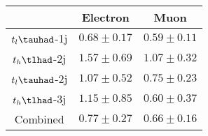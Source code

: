 \centering
\begin{tabular}{|c|c|c|} \hline
 & Electron & Muon\\\hline
$t_{l}\tauhad$-1j & $0.68\pm0.17$ & $0.59\pm0.11$\\\hline
$t_{h}\tlhad$-2j & $1.57\pm0.69$ & $1.07\pm0.32$\\\hline
$t_{l}\tauhad$-2j & $1.07\pm0.52$ & $0.75\pm0.23$\\\hline
$t_{h}\tlhad$-3j & $1.15\pm0.85$ & $0.60\pm0.37$\\\hline
Combined & $0.77\pm0.27$ & $0.66\pm0.16$\\\hline
\end{tabular}
